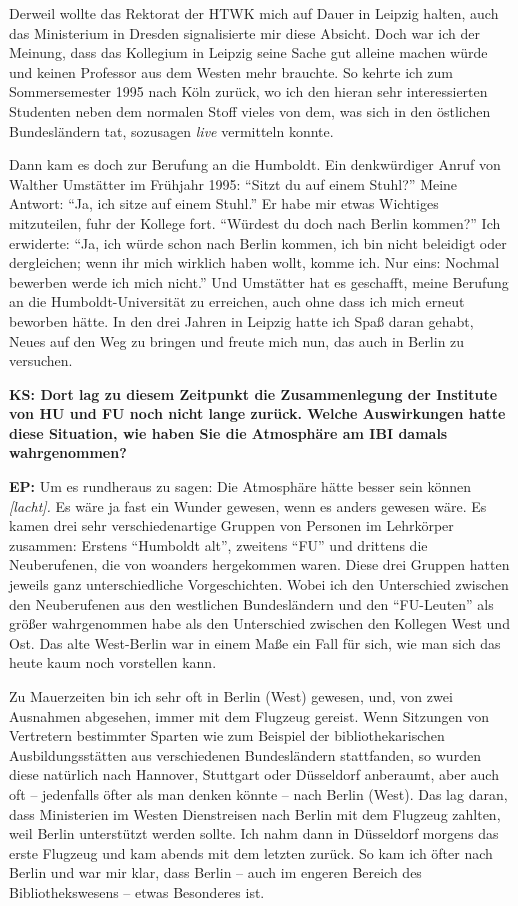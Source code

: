 \documentclass[a4paper,
fontsize=11pt,
oneside,
numbers=noperiodatend,
parskip=half-,
bibliography=totoc,
final
]{scrartcl}
\begin{document}
Derweil wollte das Rektorat der HTWK mich auf Dauer in Leipzig halten,
auch das Ministerium in Dresden signalisierte mir diese Absicht. Doch
war ich der Meinung, dass das Kollegium in Leipzig seine Sache gut
alleine machen würde und keinen Professor aus dem Westen mehr brauchte.
So kehrte ich zum Sommersemester 1995 nach Köln zurück, wo ich den
hieran sehr interessierten Studenten neben dem normalen Stoff vieles von
dem, was sich in den östlichen Bundesländern tat, sozusagen \emph{live}
vermitteln konnte.

Dann kam es doch zur Berufung an die Humboldt. Ein denkwürdiger Anruf
von Walther Umstätter im Frühjahr 1995: \enquote{Sitzt du auf einem
Stuhl?} Meine Antwort: \enquote{Ja, ich sitze auf einem Stuhl.} Er habe
mir etwas Wichtiges mitzuteilen, fuhr der Kollege fort. \enquote{Würdest
du doch nach Berlin kommen?} Ich erwiderte: \enquote{Ja, ich würde schon
nach Berlin kommen, ich bin nicht beleidigt oder dergleichen; wenn ihr
mich wirklich haben wollt, komme ich. Nur eins: Nochmal bewerben werde
ich mich nicht.} Und Umstätter hat es geschafft, meine Berufung an die
Humboldt-Universität zu erreichen, auch ohne dass ich mich erneut
beworben hätte. In den drei Jahren in Leipzig hatte ich Spaß daran
gehabt, Neues auf den Weg zu bringen und freute mich nun, das auch in
Berlin zu versuchen.

\textbf{KS: Dort lag zu diesem Zeitpunkt die Zusammenlegung der
Institute von HU und FU noch nicht lange zurück. Welche Auswirkungen
hatte diese Situation, wie haben Sie die Atmosphäre am IBI damals
wahrgenommen?}

\textbf{EP:} Um es rundheraus zu sagen: Die Atmosphäre hätte besser sein
können \emph{{[}lacht{]}.} Es wäre ja fast ein Wunder gewesen, wenn es
anders gewesen wäre. Es kamen drei sehr verschiedenartige Gruppen von
Personen im Lehrkörper zusammen: Erstens \enquote{Humboldt alt},
zweitens \enquote{FU} und drittens die Neuberufenen, die von woanders
hergekommen waren. Diese drei Gruppen hatten jeweils ganz
unterschiedliche Vorgeschichten. Wobei ich den Unterschied zwischen den
Neuberufenen aus den westlichen Bundesländern und den
\enquote{FU-Leuten} als größer wahrgenommen habe als den Unterschied
zwischen den Kollegen West und Ost. Das alte West-Berlin war in einem
Maße ein Fall für sich, wie man sich das heute kaum noch vorstellen
kann.

Zu Mauerzeiten bin ich sehr oft in Berlin (West) gewesen, und, von zwei
Ausnahmen abgesehen, immer mit dem Flugzeug gereist. Wenn Sitzungen von
Vertretern bestimmter Sparten wie zum Beispiel der bibliothekarischen
Ausbildungsstätten aus verschiedenen Bundesländern stattfanden, so
wurden diese natürlich nach Hannover, Stuttgart oder Düsseldorf
anberaumt, aber auch oft -- jedenfalls öfter als man denken könnte --
nach Berlin (West). Das lag daran, dass Ministerien im Westen
Dienstreisen nach Berlin mit dem Flugzeug zahlten, weil Berlin
unterstützt werden sollte. Ich nahm dann in Düsseldorf morgens das erste
Flugzeug und kam abends mit dem letzten zurück. So kam ich öfter nach
Berlin und war mir klar, dass Berlin -- auch im engeren Bereich des
Bibliothekswesens -- etwas Besonderes ist.
\end{document}
